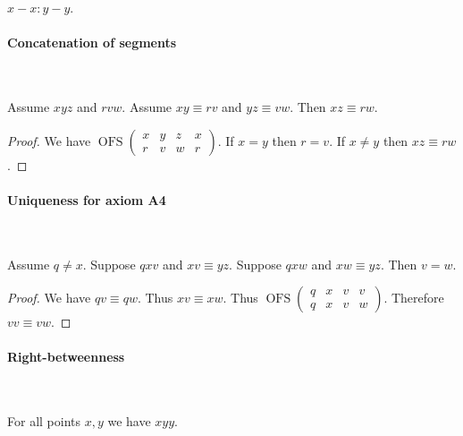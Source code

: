 \documentclass{article}
\newcommand{\Cong}[4]{#1 #2 \equiv #3 #4}
\newcommand{\Betw}[3]{#1 #2 #3}
\newcommand{\OFS}[8]{\operatorname{OFS}
\left(\begin{smallmatrix}%
#1 & #2 & #3 & #4 \\
#5 & #6 & #7 & #8
\end{smallmatrix}\right)%
}
\begin{document}
  \begin{forthel}
    \begin{lemma} %
      $x-x : y-y$.
    \end{lemma}
  \end{forthel}


  \paragraph{Concatenation of segments}\

  \begin{forthel}
    \begin{lemma} %
      Assume $\Betw{x}{y}{z}$ and $\Betw{r}{v}{w}$.
      Assume $\Cong{x}{y}{r}{v}$ and $\Cong{y}{z}{v}{w}$.
      Then $\Cong{x}{z}{r}{w}$.
    \end{lemma}
    \begin{proof}
      We have $\OFS{x}{y}{z}{x}{r}{v}{w}{r}$. %
      If $x = y$ then $r = v$.                %
      If $x \neq y$ then $\Cong{x}{z}{r}{w}$. %
    \end{proof}
  \end{forthel}


  \paragraph{Uniqueness for axiom A4}\

  \begin{forthel}
    \begin{lemma} %
      Assume $q \neq x$.
      Suppose $\Betw{q}{x}{v}$ and $\Cong{x}{v}{y}{z}$.
      Suppose $\Betw{q}{x}{w}$ and $\Cong{x}{w}{y}{z}$.
      Then $v = w$.
    \end{lemma}
    \begin{proof}
      We have $\Cong{q}{v}{q}{w}$.
      Thus $\Cong{x}{v}{x}{w}$.
      Thus $\OFS{q}{x}{v}{v}{q}{x}{v}{w}$.
      Therefore $\Cong{v}{v}{v}{w}$.
    \end{proof}
  \end{forthel}


  \paragraph{Right-betweenness}\

  \begin{forthel}
    \begin{lemma} %
      For all points $x, y$ we have $\Betw{x}{y}{y}$.
    \end{lemma}
  \end{forthel}
\end{document}
